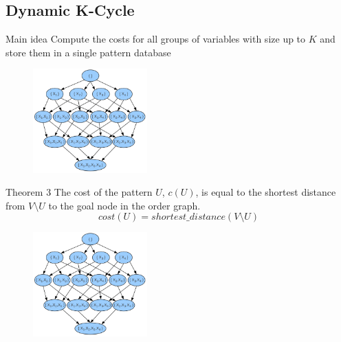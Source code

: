 \subsection{Dynamic K-Cycle}

\begin{frame}
	\begin{block}{Main idea}
		Compute the costs for all groups of variables with size up to $K$ and store them in a \alert{single} pattern database
	\end{block}
	\begin{figure}
		\centering
		\includegraphics[height=4cm]{./images/order_graph}
	\end{figure}
\end{frame}

\begin{frame}
	\begin{block}{Theorem 3}
		The cost of the pattern $U$, $c( U )$, is equal to the shortest distance from $V \setminus U$ to the goal node in the order graph.
			\[ cost( U ) = shortest\_distance( V \setminus U ) \]
	\end{block}
	\begin{figure}
		\centering
		\includegraphics[height=4cm]{./images/order_graph}
	\end{figure}
\end{frame}

